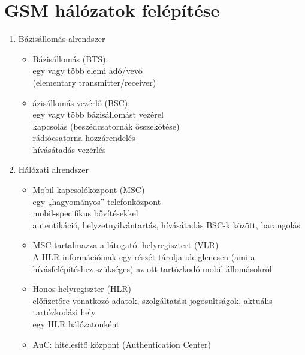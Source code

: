\documentclass[10pt,a4paper]{article}
\begin{document}
	\section{GSM hálózatok felépítése}
\begin{enumerate}
	\item Bázisállomás-alrendszer
	\begin{itemize}
	\item Bázisállomás (BTS): \\
	egy vagy több elemi adó/vevő \\
	(elementary transmitter/receiver)
	\item ázisállomás-vezérlő (BSC):
	\\egy vagy több bázisállomást vezérel
	\\kapcsolás (beszédcsatornák összekötése)
	\\rádiócsatorna-hozzárendelés
	\\hívásátadás-vezérlés
	\end{itemize}
	\item Hálózati alrendszer
	\begin{itemize}
		\item Mobil kapcsolóközpont (MSC)
		\\egy „hagyományos” telefonközpont
		\\mobil-specifikus bővítésekkel
		\\autentikáció, helyzetnyilvántartás, hívásátadás BSC-k között, barangolás
		\item MSC tartalmazza a látogatói helyregisztert (VLR)
		\\A HLR információinak egy részét tárolja ideiglenesen (ami a hívásfelépítéshez szükséges) az
		ott tartózkodó mobil állomásokról
		\item Honos helyregiszter (HLR)
		\\ előfizetőre vonatkozó adatok, szolgáltatási jogosultságok, aktuális
		tartózkodási hely
		\\ egy HLR hálózatonként
		\item AuC: hitelesítő központ (Authentication Center)
	\end{itemize}
\end{enumerate}
\end{document}
